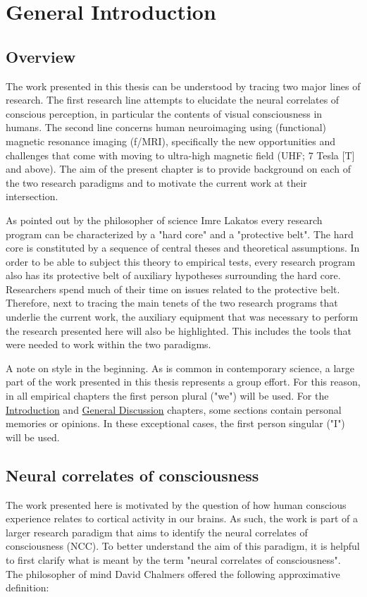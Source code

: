 \chapter{General Introduction}
\label{ch:chapter01}

\clearpage{\thispagestyle{empty}\cleardoublepage}

\section{Overview}
The work presented in this thesis can be understood by tracing two major lines of research. The first research line attempts to elucidate the neural correlates of conscious perception, in particular the contents of visual consciousness in humans. The second line concerns human neuroimaging using (functional) magnetic resonance imaging (f/MRI), specifically the new opportunities and challenges that come with moving to ultra-high magnetic field (UHF; 7 Tesla [T] and above). The aim of the present chapter is to provide background on each of the two research paradigms and to motivate the current work at their intersection.

As pointed out by the philosopher of science Imre Lakatos \parencite*{Lakatos1970} every research program can be characterized by a "hard core" and a "protective belt". The hard core is constituted by a sequence of central theses and theoretical assumptions. In order to be able to subject this theory to empirical tests, every research program also has its protective belt of auxiliary hypotheses surrounding the hard core. Researchers spend much of their time on issues related to the protective belt. Therefore, next to tracing the main tenets of the two research programs that underlie the current work, the auxiliary equipment that was necessary to perform the research presented here will also be highlighted. This includes the tools that were needed to work within the two paradigms.

A note on style in the beginning. As is common in contemporary science, a large part of the work presented in this thesis represents a group effort. For this reason, in all empirical chapters the first person plural ("we") will be used. For the \hyperref[ch:chapter01]{Introduction} and \hyperref[ch:chapter05]{General Discussion} chapters, some sections contain personal memories or opinions. In these exceptional cases, the first person singular ("I") will be used.

\section{Neural correlates of consciousness}
The work presented here is motivated by the question of how human conscious experience relates to cortical activity in our brains. As such, the work is part of a larger research paradigm that aims to identify the neural correlates of consciousness (NCC). To better understand the aim of this paradigm, it is helpful to first clarify what is meant by the term "neural correlates of consciousness". The philosopher of mind David Chalmers \parencite*{Chalmers2000} offered the following approximative definition:

